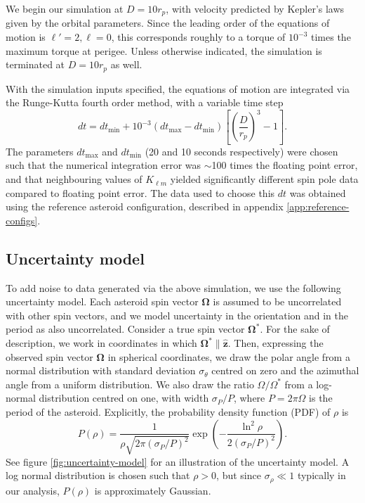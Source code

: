 \documentclass[fleqn,usenatbib]{mnras}
\newcommand{\unit}[1]{\bm{\hat{#1}}}
\newcommand{\parens}[1]{\left( #1 \right)}
\newcommand{\brackets}[1]{\left[ #1 \right]}
\begin{document}
We begin our simulation at $D = 10 r_p$, with velocity predicted by Kepler's laws given by the orbital parameters. Since the leading order of the equations of motion is $\ell' = 2, \ell = 0$, this corresponds roughly to a torque of $10^{-3}$ times the maximum torque at perigee. Unless otherwise indicated, the simulation is terminated at $D=10 r_p$ as well.

With the simulation inputs specified, the equations of motion are integrated via the Runge-Kutta fourth order method, with a variable time step
\begin{equation}
  dt = dt_\text{min} + 10^{-3}(dt_\text{max} - dt_\text{min}) \brackets{\parens{\frac{D}{r_p}}^3 - 1}.
\end{equation}
The parameters $dt_\text{max}$ and $dt_\text{min}$ (20 and 10 seconds respectively) were chosen such that the numerical integration error was $\sim$100 times the floating point error, and that neighbouring values of $K_{\ell m}$ yielded significantly different spin pole data compared to floating point error. The data used to choose this $dt$ was obtained using the reference asteroid configuration, described in appendix \ref{app:reference-configs}.



\subsection{Uncertainty model}
\label{sec:uncertainty}

To add noise to data generated via the above simulation, we use the following uncertainty model. Each asteroid spin vector $\bm \Omega$ is assumed to be uncorrelated with other spin vectors, and we model uncertainty in the orientation and in the period as also uncorrelated. Consider a true spin vector $\bm \Omega^*$. For the sake of description, we work in coordinates in which $\bm \Omega^* \parallel \unit z$. Then, expressing the observed spin vector $\bm \Omega$ in spherical coordinates, we draw the polar angle from a normal distribution with standard deviation $\sigma_\theta$ centred on zero and the azimuthal angle from a uniform distribution. We also draw the ratio $\Omega/\Omega^*$ from a log-normal distribution centred on one, with width $\sigma_P / P$, where $P = 2\pi \Omega$ is the period of the asteroid. Explicitly, the probability density function (PDF) of $\rho$ is 
\begin{equation}
  P(\rho) = \frac{1}{\rho\sqrt{2\pi (\sigma_P / P)^2}} \exp\parens{-\frac{\ln^2\rho}{2(\sigma_P / P)^2}}.
\end{equation}
See figure \ref{fig:uncertainty-model} for an illustration of the uncertainty model. A log normal distribution is chosen such that $\rho > 0$, but since $\sigma_\rho \ll 1$ typically in our analysis, $P(\rho)$ is approximately Gaussian.
\end{document}
